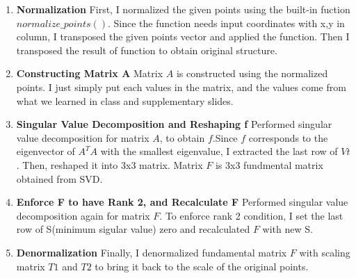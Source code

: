 \begin{enumerate}
    \item \textbf{Normalization}
    First, I normalized the given points using the built-in fuction $normalize\_points()$. Since the function needs input coordinates with x,y in column, I transposed the given points vector and applied the function.
    Then I transposed the result of function to obtain original structure.
    
    \item \textbf{Constructing Matrix A}
    Matrix $A$ is constructed using the normalized points. I just simply put each values in the matrix, and the values come from what we learned in class and supplementary slides.
    
    \item \textbf{Singular Value Decomposition and Reshaping f}
    Performed singular value decomposition for matrix $A$, to obtain $f$.Since $f$ corresponds to the eigenvector of $A^TA$ with the smallest eigenvalue, I extracted the last row of $Vt$. Then, reshaped it into 3x3 matrix. Matrix $F$ is 3x3 fundmental matrix obtained from SVD.
    
    \item \textbf{Enforce F to have Rank 2, and Recalculate F}
    Performed singular value decomposition again for matrix $F$. To enforce rank 2 condition, I set the last row of S(minimum sigular value) zero and recalculated $F$ with new S.
    
    \item \textbf{Denormalization}
    Finally, I denormalized fundamental matrix $F$ with scaling matrix $T1$ and $T2$ to bring it back to the scale of the original points.
\end{enumerate}

